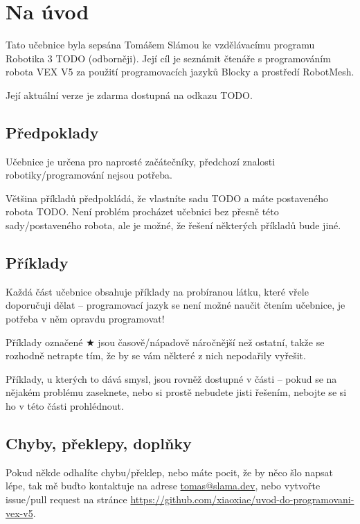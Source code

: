 \documentclass[11pt]{article}
\begin{document}
\newcommand{\blockBumperPressed}{\item[\block] \centerimage{1.6em}{../Images/blocks/bumper-pressed.png} -- podmínka, která říká, zda je daný senzor stisknutý.}

\setcounter{secnumdepth}{0}
\section{Na úvod}
Tato učebnice byla sepsána Tomášem Slámou ke vzdělávacímu programu Robotika 3 TODO (odborněji). Její cíl je seznámit čtenáře s programováním robota VEX V5 za použití programovacích jazyků Blocky a prostředí RobotMesh.

Její aktuální verze je zdarma dostupná na odkazu TODO.

\subsection{Předpoklady}
Učebnice je určena pro naprosté začátečníky, předchozí znalosti robotiky/programování nejsou potřeba.

Většina příkladů předpokládá, že vlastníte sadu TODO a máte postaveného robota TODO. Není problém procházet učebnici bez přesně této sady/postaveného robota, ale je možné, že řešení některých příkladů bude jiné.

\subsection{Příklady}
Každá část učebnice obsahuje příklady na probíranou látku, které vřele doporučuji dělat -- programovací jazyk se není možné naučit čtením učebnice, je potřeba v něm opravdu programovat!

Příklady označené $\bigstar$ jsou časově/nápadově náročnější než ostatní, takže se rozhodně netrapte tím, že by se vám některé z nich nepodařily vyřešit.

Příklady, u kterých to dává smysl, jsou rovněž dostupné v části  -- pokud se na nějakém problému zaseknete, nebo si prostě nebudete jisti řešením, nebojte se si ho v této části prohlédnout.

\subsection{Chyby, překlepy, doplňky}
Pokud někde odhalíte chybu/překlep, nebo máte pocit, že by něco šlo napsat lépe, tak mě buďto kontaktuje na adrese \href{mailto:tomas@slama.dev}{tomas@slama.dev}, nebo vytvořte issue/pull request na stránce \url{https://github.com/xiaoxiae/uvod-do-programovani-vex-v5}.
\end{document}
